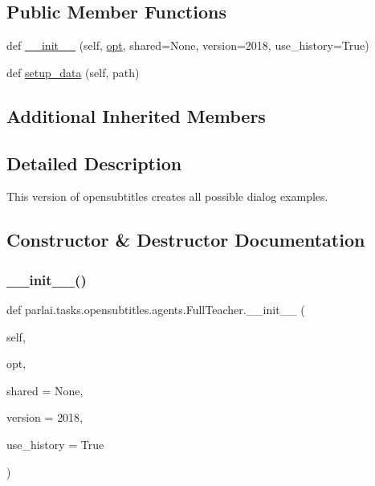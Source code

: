 \subsection*{Public Member Functions}
\begin{DoxyCompactItemize}
\item 
def \hyperlink{classparlai_1_1tasks_1_1opensubtitles_1_1agents_1_1FullTeacher_aadd6073a3a0cd25d780679e824fb0673}{\+\_\+\+\_\+init\+\_\+\+\_\+} (self, \hyperlink{classparlai_1_1core_1_1teachers_1_1FbDialogTeacher_af7a9ec497b9cd0292d7b8fa220da7c28}{opt}, shared=None, version=\textquotesingle{}2018\textquotesingle{}, use\+\_\+history=True)
\item 
def \hyperlink{classparlai_1_1tasks_1_1opensubtitles_1_1agents_1_1FullTeacher_abd9f716304f56c2b8b7f7573d34c87f6}{setup\+\_\+data} (self, path)
\end{DoxyCompactItemize}
\subsection*{Additional Inherited Members}


\subsection{Detailed Description}
\begin{DoxyVerb}This version of opensubtitles creates all possible dialog examples.
\end{DoxyVerb}
 

\subsection{Constructor \& Destructor Documentation}
\mbox{\label{classparlai_1_1tasks_1_1opensubtitles_1_1agents_1_1FullTeacher_aadd6073a3a0cd25d780679e824fb0673}} 
\subsubsection{\texorpdfstring{\+\_\+\+\_\+init\+\_\+\+\_\+()}{\_\_init\_\_()}}
{\footnotesize\ttfamily def parlai.\+tasks.\+opensubtitles.\+agents.\+Full\+Teacher.\+\_\+\+\_\+init\+\_\+\+\_\+ (\begin{DoxyParamCaption}\item[{}]{self,  }\item[{}]{opt,  }\item[{}]{shared = {\ttfamily None},  }\item[{}]{version = {\ttfamily \textquotesingle{}2018\textquotesingle{}},  }\item[{}]{use\+\_\+history = {\ttfamily True} }\end{DoxyParamCaption})}



